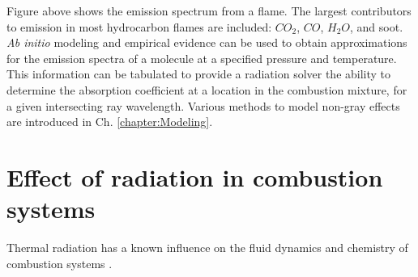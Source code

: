 Figure above shows the emission spectrum from a flame. The largest contributors to emission in most hydrocarbon flames are included: $CO_2$, $CO$, $H_2O$, and soot.
\textit{Ab initio} modeling and empirical evidence can be used to obtain approximations for the emission spectra of a molecule at a specified pressure and temperature. This information can be tabulated to provide a radiation solver the ability to determine the absorption coefficient at a location in the combustion mixture, for a given intersecting ray wavelength. Various methods to model non-gray effects are introduced in Ch. \ref{chapter:Modeling}.

\section{Effect of radiation in combustion systems}
Thermal radiation has a known influence on the fluid dynamics and chemistry of combustion systems \cite{Modest2013RadiativeTransfer}.


